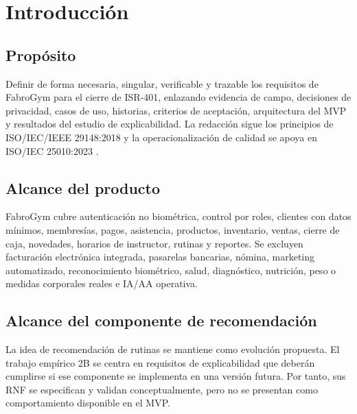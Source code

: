 \documentclass[11pt,a4paper,twoside]{article}
\begin{document}
\section{Introducción}
\subsection{Propósito}
Definir de forma necesaria, singular, verificable y trazable los requisitos de FabroGym para el cierre de ISR-401, enlazando evidencia de campo, decisiones de privacidad, casos de uso, historias, criterios de aceptación, arquitectura del MVP y resultados del estudio de explicabilidad. La redacción sigue los principios de ISO/IEC/IEEE 29148:2018 y la operacionalización de calidad se apoya en ISO/IEC 25010:2023 \cite{iso29148,iso25010,pohl2010,swebok2024}.

\subsection{Alcance del producto}
FabroGym cubre autenticación no biométrica, control por roles, clientes con datos mínimos, membresías, pagos, asistencia, productos, inventario, ventas, cierre de caja, novedades, horarios de instructor, rutinas y reportes. Se excluyen facturación electrónica integrada, pasarelas bancarias, nómina, marketing automatizado, reconocimiento biométrico, salud, diagnóstico, nutrición, peso o medidas corporales reales e IA/AA operativa.

\subsection{Alcance del componente de recomendación}
La idea de recomendación de rutinas se mantiene como evolución propuesta. El trabajo empírico 2B se centra en requisitos de explicabilidad que deberán cumplirse si ese componente se implementa en una versión futura. Por tanto, sus RNF se especifican y validan conceptualmente, pero no se presentan como comportamiento disponible en el MVP.
\end{document}
